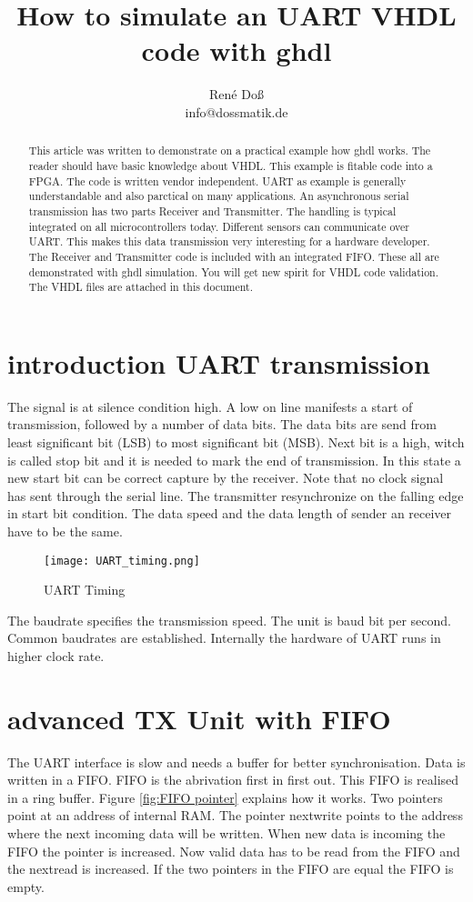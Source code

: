 \documentclass[a4paper,11pt]{article}
\title{How to simulate an UART VHDL code with ghdl}
\author{René Doß \\ info@dossmatik.de}
\begin{document}
\maketitle
\tableofcontents

\begin{abstract}
This article was written to demonstrate on a practical example how ghdl works. The reader should have basic knowledge about VHDL. This example is fitable code into a FPGA. The code is written vendor independent. UART as example is generally understandable and also parctical on many applications.
An asynchronous serial transmission has two parts Receiver and Transmitter. The handling is typical integrated on all microcontrollers today. Different sensors can communicate over UART. This makes this data transmission very interesting for a hardware developer. The Receiver and Transmitter code is included with an integrated FIFO. These all are demonstrated with ghdl simulation. You will get new spirit for VHDL code validation. The VHDL files are attached in this document.
\end{abstract}

\newpage
\section{introduction UART transmission}
The signal is at silence condition high. A low on line manifests a start of transmission, followed by a number of data bits. The data bits are send from least significant bit (LSB) to most significant bit (MSB). Next bit is a high, witch is called stop bit and it is needed to mark the end of transmission. In this state a new start bit can be correct capture by the receiver. Note that no clock signal has sent through the serial line. The transmitter resynchronize on the falling edge in start bit condition. The data speed and the data length of sender an receiver have to be the same.
\begin{figure}[H]
  \begin{center}
    \texttt{[image: UART\_timing.png]}
    \caption{UART Timing}
    \label{fig:UART Timing}
  \end{center}
\end{figure}

The baudrate specifies the transmission speed. The unit is baud bit per second.  Common baudrates are established. 
Internally the hardware of UART runs in higher clock rate.

\section{advanced TX Unit with FIFO}
The UART interface is slow and needs a buffer for better synchronisation. Data is written in a FIFO. FIFO is the abrivation first in first out. This FIFO is realised in a ring buffer. Figure \ref{fig:FIFO pointer} explains how it works. Two pointers point at an address of internal RAM. The pointer nextwrite points to the address where the next incoming data will be written. When new data is incoming the FIFO the pointer is increased. Now valid data has to be read from the FIFO  and the nextread is increased. If the two pointers in the FIFO are equal the FIFO is empty.
\end{document}
